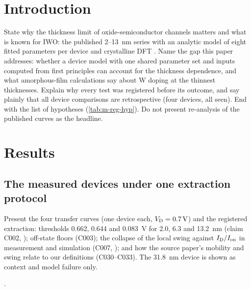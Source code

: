 \documentclass[11pt]{article}
\begin{document}
\section{Introduction}
\label{sec:intro}
\begin{pdIntent}
State why the thickness limit of oxide-semiconductor channels matters and what is known for IWO: the published
2--\SI{13}{nm} series with an analytic model of eight fitted parameters per device and crystalline DFT
\citep{Januar2026}. %
Name the gap this paper addresses: whether a device model with one shared parameter set and inputs computed from first
principles can account for the thickness dependence, and what amorphous-film calculations say about W doping at the
thinnest thicknesses. Explain why every test was registered before its outcome, and say plainly that all device
comparisons are retrospective (four devices, all seen). End with the list of hypotheses (\cref{tab:m-reg-hyp}). Do not
present re-analysis of the published curves as the headline. %
\end{pdIntent}

\section{Results}
\label{sec:results}

\subsection{The measured devices under one extraction protocol}
\label{sec:r-data}
\begin{pdIntent}
Present the four transfer curves (one device each, $V_{\mathrm{D}} = \SI{0.7}{V}$) and the registered extraction: thresholds
0.662, 0.644 and \SI{0.083}{V} for 2.0, 6.3 and \SI{13.2}{nm} (claim C002, ); off-state floors
(C003); the collapse of the local swing against $I_{\mathrm{D}}/I_{\mathrm{on}}$ in measurement and simulation (C007, ); and
how the source paper's mobility and swing relate to our definitions (C030--C033). The \SI{31.8}{nm} device is shown as
context and model failure only. %
\end{pdIntent}
. %
\end{document}
